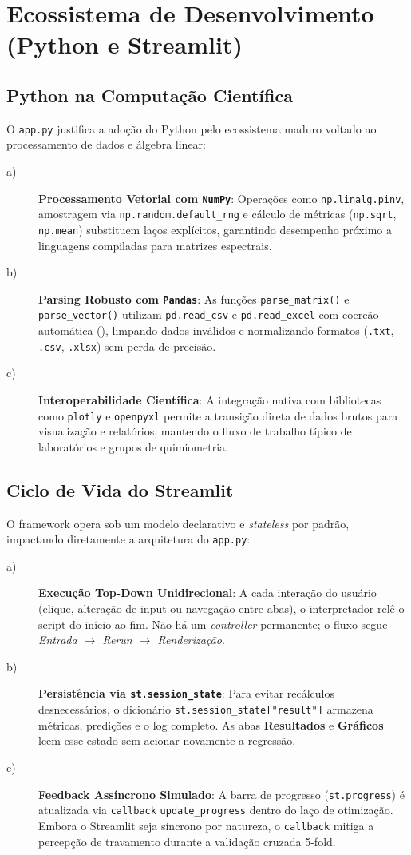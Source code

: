 \chapter{Ecossistema de Desenvolvimento (Python e Streamlit)}
\section{Python na Computação Científica}
O \verb|app.py| justifica a adoção do Python pelo ecossistema maduro voltado ao processamento de dados e álgebra linear:
\begin{description}
\item[a)] \textbf{Processamento Vetorial com \texttt{NumPy}}: Operações como \verb|np.linalg.pinv|, amostragem via \verb|np.random.default_rng| e cálculo de métricas (\verb|np.sqrt|, \verb|np.mean|) substituem laços explícitos, garantindo desempenho próximo a linguagens compiladas para matrizes espectrais.
\item[b)] \textbf{Parsing Robusto com \texttt{Pandas}}: As funções \verb|parse_matrix()| e \verb|parse_vector()| utilizam \verb|pd.read_csv| e \verb|pd.read_excel| com coercão automática (), limpando dados inválidos e normalizando formatos (\texttt{.txt}, \texttt{.csv}, \texttt{.xlsx}) sem perda de precisão.
\item[c)] \textbf{Interoperabilidade Científica}: A integração nativa com bibliotecas como \verb|plotly| e \verb|openpyxl| permite a transição direta de dados brutos para visualização e relatórios, mantendo o fluxo de trabalho típico de laboratórios e grupos de quimiometria.
\end{description}

\section{Ciclo de Vida do Streamlit}
O framework opera sob um modelo declarativo e \textit{stateless} por padrão, impactando diretamente a arquitetura do \verb|app.py|:
\begin{description}
\item[a)] \textbf{Execução Top-Down Unidirecional}: A cada interação do usuário (clique, alteração de input ou navegação entre abas), o interpretador relê o script do início ao fim. Não há um \textit{controller} permanente; o fluxo segue \textit{Entrada $\rightarrow$ Rerun $\rightarrow$ Renderização}.
\item[b)] \textbf{Persistência via \texttt{st.session\_state}}: Para evitar recálculos desnecessários, o dicionário \verb|st.session_state["result"]| armazena métricas, predições e o log completo. As abas \textbf{Resultados} e \textbf{Gráficos} leem esse estado sem acionar novamente a regressão.
\item[c)] \textbf{Feedback Assíncrono Simulado}: A barra de progresso (\verb|st.progress|) é atualizada via \texttt{callback} \verb|update_progress| dentro do laço de otimização. Embora o Streamlit seja síncrono por natureza, o \texttt{callback} mitiga a percepção de travamento durante a validação cruzada 5-fold.
\end{description}

